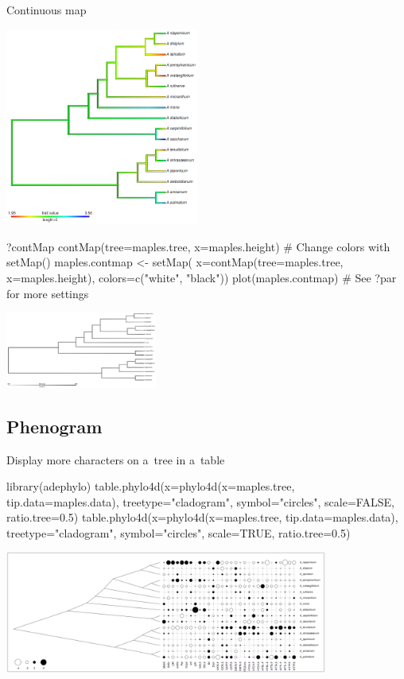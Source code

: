 \documentclass[compress, xelatex, 11pt, xcolor=svgnames, aspectratio=169,
	hyperref={
		bookmarks=true,
		unicode=true,
		colorlinks=true,
		pdftitle={Molecular data in R},
		plainpages=false,
		pdfauthor={Vojtech Zeisek},
		pdfsubject={Course about phylogeny and evolution in R},
		pdfcreator={XeLaTeX},
		pdfkeywords={R, evolution, phylogeny, molecular data},
		linkcolor=Crimson, %
		anchorcolor=Magenta, %
		citecolor=Magenta, %
		filecolor=Magenta, %
		menucolor=Magenta, %
		urlcolor=DodgerBlue, %
		},
	url={hyphens, lowtilde} %
	]{beamer}
\begin{document}
\begin{frame}[fragile]{Continuous map}
	\begin{multicols}{2}
		\begin{center}
			\includegraphics[height=6.5cm]{contmap.png}
		\end{center}
		\begin{spluscode}
    ?contMap
    contMap(tree=maples.tree,
      x=maples.height)
    # Change colors with setMap()
    maples.contmap <- setMap(
      x=contMap(tree=maples.tree,
      x=maples.height),
      colors=c("white", "black"))
    plot(maples.contmap)
    # See ?par for more settings
		\end{spluscode}
		\begin{center}
			\includegraphics[height=2.5cm]{contmapbw.png}
		\end{center}
		\vfill
	\end{multicols}
\end{frame}

\subsection{Phenogram}

\begin{frame}[fragile]{Display more characters on a~tree in a~table}
	\begin{spluscode}
    library(adephylo)
    table.phylo4d(x=phylo4d(x=maples.tree, tip.data=maples.data),
      treetype="cladogram", symbol="circles", scale=FALSE, ratio.tree=0.5)
    table.phylo4d(x=phylo4d(x=maples.tree, tip.data=maples.data),
      treetype="cladogram", symbol="circles", scale=TRUE, ratio.tree=0.5)
	\end{spluscode}
	\begin{center}
		\includegraphics[height=4cm]{phylotable.png}
	\end{center}
\end{frame}
\end{document}
